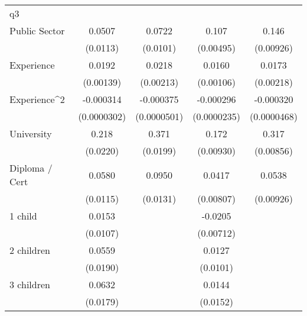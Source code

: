 {\begin{tabular}{l*{4}{c}}
\hline
q3                  &                     &                     &                     &                     \\
Public Sector       &      0.0507\sym{***}&      0.0722\sym{***}&       0.107\sym{***}&       0.146\sym{***}\\
                    &    (0.0113)         &    (0.0101)         &   (0.00495)         &   (0.00926)         \\
[1em]
Experience          &      0.0192\sym{***}&      0.0218\sym{***}&      0.0160\sym{***}&      0.0173\sym{***}\\
                    &   (0.00139)         &   (0.00213)         &   (0.00106)         &   (0.00218)         \\
[1em]
Experience^{2}      &   -0.000314\sym{***}&   -0.000375\sym{***}&   -0.000296\sym{***}&   -0.000320\sym{***}\\
                    & (0.0000302)         & (0.0000501)         & (0.0000235)         & (0.0000468)         \\
[1em]
University          &       0.218\sym{***}&       0.371\sym{***}&       0.172\sym{***}&       0.317\sym{***}\\
                    &    (0.0220)         &    (0.0199)         &   (0.00930)         &   (0.00856)         \\
[1em]
Diploma / Cert      &      0.0580\sym{***}&      0.0950\sym{***}&      0.0417\sym{***}&      0.0538\sym{***}\\
                    &    (0.0115)         &    (0.0131)         &   (0.00807)         &   (0.00926)         \\
[1em]
1 child             &      0.0153         &                     &     -0.0205\sym{**} &                     \\
                    &    (0.0107)         &                     &   (0.00712)         &                     \\
[1em]
2 children          &      0.0559\sym{**} &                     &      0.0127         &                     \\
                    &    (0.0190)         &                     &    (0.0101)         &                     \\
[1em]
3 children          &      0.0632\sym{***}&                     &      0.0144         &                     \\
                    &    (0.0179)         &                     &    (0.0152)         &                     \\

\end{tabular}}
